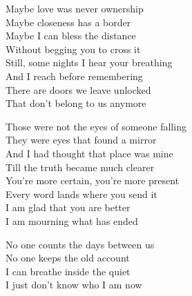 \begin{lyrics}
Maybe love was never ownership\\
Maybe closeness has a border\\
Maybe I can bless the distance\\
Without begging you to cross it\\
Still, some nights I hear your breathing\\
And I reach before remembering\\
There are doors we leave unlocked\\
That don’t belong to us anymore

Those were not the eyes of someone falling\\
They were eyes that found a mirror\\
And I had thought that place was mine\\
Till the truth became much clearer\\
You’re more certain, you’re more present\\
Every word lands where you send it\\
I am glad that you are better\\
I am mourning what has ended

No one counts the days between us\\
No one keeps the old account\\
I can breathe inside the quiet\\
I just don’t know who I am now
\end{lyrics}

